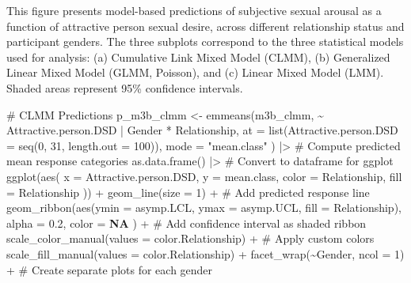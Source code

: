 \documentclass[
  bookmarksnumbered]{article}
\newenvironment{Shaded}{\begin{snugshade}}{\end{snugshade}}
\newcommand{\AttributeTok}[1]{\textcolor[rgb]{0.80,0.80,0.80}{#1}}
\newcommand{\CommentTok}[1]{\textcolor[rgb]{0.50,0.62,0.50}{#1}}
\newcommand{\ConstantTok}[1]{\textcolor[rgb]{0.86,0.64,0.64}{\textbf{#1}}}
\newcommand{\DecValTok}[1]{\textcolor[rgb]{0.86,0.86,0.80}{#1}}
\newcommand{\FloatTok}[1]{\textcolor[rgb]{0.75,0.75,0.82}{#1}}
\newcommand{\FunctionTok}[1]{\textcolor[rgb]{0.94,0.94,0.56}{#1}}
\newcommand{\NormalTok}[1]{\textcolor[rgb]{0.80,0.80,0.80}{#1}}
\newcommand{\OtherTok}[1]{\textcolor[rgb]{0.94,0.94,0.56}{#1}}
\newcommand{\SpecialCharTok}[1]{\textcolor[rgb]{0.86,0.64,0.64}{#1}}
\newcommand{\StringTok}[1]{\textcolor[rgb]{0.80,0.58,0.58}{#1}}
\begin{document}
This figure presents model-based predictions of subjective sexual arousal as a function of attractive person sexual desire, across different relationship status and participant genders. The three subplots correspond to the three statistical models used for analysis: (a) Cumulative Link Mixed Model (CLMM), (b) Generalized Linear Mixed Model (GLMM, Poisson), and (c) Linear Mixed Model (LMM). Shaded areas represent 95\% confidence intervals.

\begin{Shaded}
\begin{Highlighting}[]
\CommentTok{\# CLMM Predictions}
\NormalTok{p\_m3b\_clmm }\OtherTok{\textless{}{-}} \FunctionTok{emmeans}\NormalTok{(m3b\_clmm, }\SpecialCharTok{\textasciitilde{}}\NormalTok{ Attractive.person.DSD }\SpecialCharTok{|}\NormalTok{ Gender }\SpecialCharTok{*}\NormalTok{ Relationship,}
  \AttributeTok{at =} \FunctionTok{list}\NormalTok{(}\AttributeTok{Attractive.person.DSD =} \FunctionTok{seq}\NormalTok{(}\DecValTok{0}\NormalTok{, }\DecValTok{31}\NormalTok{, }\AttributeTok{length.out =} \DecValTok{100}\NormalTok{)),}
  \AttributeTok{mode =} \StringTok{"mean.class"}
\NormalTok{) }\SpecialCharTok{|\textgreater{}} \CommentTok{\# Compute predicted mean response categories}
  \FunctionTok{as.data.frame}\NormalTok{() }\SpecialCharTok{|\textgreater{}} \CommentTok{\# Convert to dataframe for ggplot}
  \FunctionTok{ggplot}\NormalTok{(}\FunctionTok{aes}\NormalTok{(}
    \AttributeTok{x =}\NormalTok{ Attractive.person.DSD, }\AttributeTok{y =}\NormalTok{ mean.class,}
    \AttributeTok{color =}\NormalTok{ Relationship, }\AttributeTok{fill =}\NormalTok{ Relationship}
\NormalTok{  )) }\SpecialCharTok{+}
  \FunctionTok{geom\_line}\NormalTok{(}\AttributeTok{size =} \DecValTok{1}\NormalTok{) }\SpecialCharTok{+} \CommentTok{\# Add predicted response line}
  \FunctionTok{geom\_ribbon}\NormalTok{(}\FunctionTok{aes}\NormalTok{(}\AttributeTok{ymin =}\NormalTok{ asymp.LCL, }\AttributeTok{ymax =}\NormalTok{ asymp.UCL, }\AttributeTok{fill =}\NormalTok{ Relationship),}
    \AttributeTok{alpha =} \FloatTok{0.2}\NormalTok{, }\AttributeTok{color =} \ConstantTok{NA}
\NormalTok{  ) }\SpecialCharTok{+} \CommentTok{\# Add confidence interval as shaded ribbon}
  \FunctionTok{scale\_color\_manual}\NormalTok{(}\AttributeTok{values =}\NormalTok{ color.Relationship) }\SpecialCharTok{+} \CommentTok{\# Apply custom colors}
  \FunctionTok{scale\_fill\_manual}\NormalTok{(}\AttributeTok{values =}\NormalTok{ color.Relationship) }\SpecialCharTok{+}
  \FunctionTok{facet\_wrap}\NormalTok{(}\SpecialCharTok{\textasciitilde{}}\NormalTok{Gender, }\AttributeTok{ncol =} \DecValTok{1}\NormalTok{) }\SpecialCharTok{+} \CommentTok{\# Create separate plots for each gender}

\end{Highlighting}
\end{Shaded}
\end{document}
